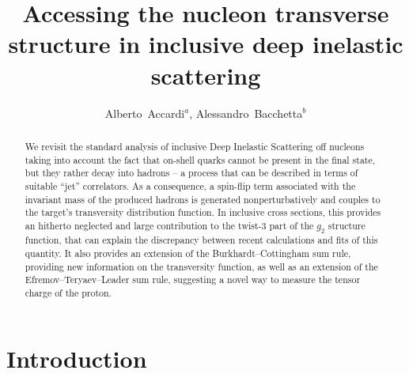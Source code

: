 \documentclass[preprintnumbers,floatfix,nofootinbib]{revtex4}
\begin{document}


\title{Accessing the nucleon transverse structure in inclusive deep inelastic scattering} 

\author{Alberto~Accardi$^{a}$, Alessandro~Bacchetta$^{b}$} 


\begin{abstract}
We revisit the standard analysis of inclusive Deep Inelastic Scattering
off nucleons taking into  account the fact that on-shell quarks cannot be present in the final state, but they rather decay into hadrons --  a process that can be described in terms of suitable ``jet'' correlators. As a consequence, a spin-flip term
associated with the invariant mass of the produced hadrons is generated
nonperturbatively and couples to the target's transversity distribution
function. In inclusive cross sections, this provides an hitherto neglected and
large contribution to the twist-3 part of the $g_2$ structure function, that
can explain the discrepancy between recent calculations and fits of this
quantity.  It also provides an extension of the Burkhardt--Cottingham sum rule, 
providing new information on the transversity function, as well as an extension of the Efremov--Teryaev--Leader sum rule, suggesting a novel way to measure the tensor charge of the proton.
\end{abstract}



\maketitle


\section{Introduction}
\end{document}
